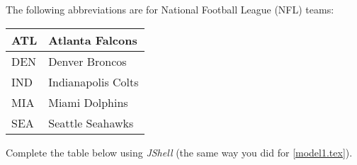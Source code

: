 
The following abbreviations are for National Football League (NFL) teams:

\begin{center}
\begin{tabular}{l|l}
ATL & Atlanta Falcons \\ \hline
DEN & Denver Broncos \\ \hline
IND & Indianapolis Colts \\ \hline
MIA & Miami Dolphins \\ \hline
SEA & Seattle Seahawks \\
\end{tabular}
\end{center}

Complete the table below using \textit{JShell} (the same way you did for \ref{model1.tex}).

\setlength{\defaultwidth}{20.8em}

